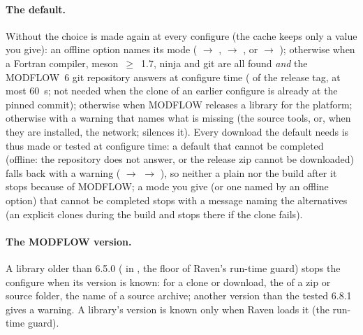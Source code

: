 \paragraph{The default.} Without  the choice is made again at every configure (the cache keeps only a value
you give): an offline option names its mode ( $\to$ ,  $\to$
,  or  $\to$ ); otherwise 
when a Fortran compiler, meson~$\geq$~1.7, ninja and git are all found \emph{and} the MODFLOW~6 git repository answers
at configure time ( of the release tag, at most 60~s; not needed when the clone of an earlier configure is
already at the pinned commit); otherwise  when MODFLOW releases a library for the platform; otherwise
 with a warning that names what is missing (the source tools, or, when they are installed, the network;
 silences it). Every download the default needs
is thus made or tested at configure time: a default that cannot be completed (offline: the repository does not answer, or
the release zip cannot be downloaded) falls back with a warning ( $\to$  $\to$ ), so
neither a plain  nor the build after it stops because of MODFLOW; a mode you give (or one named
by an offline option) that cannot be completed stops with a message naming the alternatives (an explicit 
clones during the build and stops there if the clone fails).
\paragraph{The MODFLOW version.} A library older than 6.5.0 ( in , the floor
of Raven's run-time guard) stops the configure when its version is known:  for a clone or
download, the  of a zip or source folder, the name of a source archive; another version than the tested
6.8.1 gives a warning. A  library's version is known only when Raven loads it (the run-time guard).

